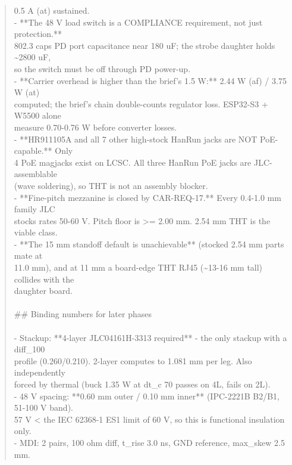 \documentclass[11pt,a4paper]{article}
\begin{document}
\begin{quote}
  0.5 A (at) sustained.\\
- {*}{*}The 48 V load switch is a COMPLIANCE requirement, not just protection.{*}{*}\\
  802.3 caps PD port capacitance near 180 uF; the strobe daughter holds \textasciitilde{}2800 uF,\\
  so the switch must be off through PD power-up.\\
- {*}{*}Carrier overhead is higher than the brief's 1.5 W:{*}{*} 2.44 W (af) / 3.75 W (at)\\
  computed; the brief's chain double-counts regulator loss. ESP32-S3 + W5500 alone\\
  measure 0.70-0.76 W before converter losses.\\
- {*}{*}HR911105A and all 7 other high-stock HanRun jacks are NOT PoE-capable.{*}{*} Only\\
  4 PoE magjacks exist on LCSC. All three HanRun PoE jacks are JLC-assemblable\\
  (wave soldering), so THT is not an assembly blocker.\\
- {*}{*}Fine-pitch mezzanine is closed by CAR-REQ-17.{*}{*} Every 0.4-1.0 mm family JLC\\
  stocks rates 50-60 V. Pitch floor is \textgreater{}= 2.00 mm. 2.54 mm THT is the viable class.\\
- {*}{*}The 15 mm standoff default is unachievable{*}{*} (stocked 2.54 mm parts mate at\\
  11.0 mm), and at 11 mm a board-edge THT RJ45 (\textasciitilde{}13-16 mm tall) collides with the\\
  daughter board.\\
~\\
\#\# Binding numbers for later phases\\
~\\
- Stackup: {*}{*}4-layer JLC04161H-3313 required{*}{*} - the only stackup with a diff\_100\\
  profile (0.260/0.210). 2-layer computes to 1.081 mm per leg. Also independently\\
  forced by thermal (buck 1.35 W at dt\_c 70 passes on 4L, fails on 2L).\\
- 48 V spacing: {*}{*}0.60 mm outer / 0.10 mm inner{*}{*} (IPC-2221B B2/B1, 51-100 V band).\\
  57 V \textless{} the IEC 62368-1 ES1 limit of 60 V, so this is functional insulation only.\\
- MDI: 2 pairs, 100 ohm diff, t\_rise 3.0 ns, GND reference, max\_skew 2.5 mm.\\

\end{quote}
\end{document}
